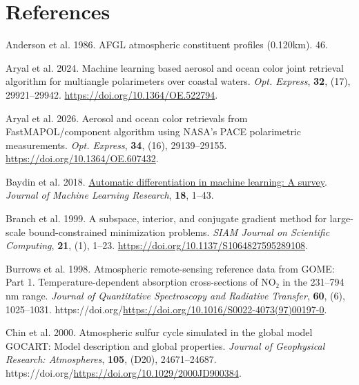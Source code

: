 \documentclass[
  11pt,
  letterpaper,
]{scrreprt}
\newlength{\cslhangindent}
\newenvironment{CSLReferences}[2] %
 {\begin{list}{}{%
  \setlength{\itemindent}{0pt}
  \setlength{\leftmargin}{0pt}
  \setlength{\parsep}{0pt}
  \ifodd #1
   \setlength{\leftmargin}{\cslhangindent}
   \setlength{\itemindent}{-1\cslhangindent}
  \fi
  \setlength{\itemsep}{#2\baselineskip}}}
 {\end{list}}
\begin{document}
\chapter*{References}\label{references}


\label{refs}
\begin{CSLReferences}{1}{1}
Anderson et al. 1986. AFGL atmospheric constituent profiles (0.120km).
46.

Aryal et al. 2024. Machine learning based aerosol and ocean color joint
retrieval algorithm for multiangle polarimeters over coastal waters.
\emph{Opt. Express}, \textbf{32}, (17), 29921--29942.
\url{https://doi.org/10.1364/OE.522794}.

Aryal et al. 2026. Aerosol and ocean color retrievals from
FastMAPOL/component algorithm using NASA's PACE polarimetric
measurements. \emph{Opt. Express}, \textbf{34}, (16), 29139--29155.
\url{https://doi.org/10.1364/OE.607432}.

Baydin et al. 2018. \href{https://arxiv.org/abs/1502.05767}{Automatic
differentiation in machine learning: A survey}. \emph{Journal of Machine
Learning Research}, \textbf{18}, 1--43.

Branch et al. 1999. A subspace, interior, and conjugate gradient method
for large-scale bound-constrained minimization problems. \emph{SIAM
Journal on Scientific Computing}, \textbf{21}, (1), 1--23.
\url{https://doi.org/10.1137/S1064827595289108}.

Burrows et al. 1998. Atmospheric remote-sensing reference data from
GOME: Part 1. Temperature-dependent absorption cross-sections of NO₂ in
the 231--794 nm range. \emph{Journal of Quantitative Spectroscopy and
Radiative Transfer}, \textbf{60}, (6), 1025--1031.
https://doi.org/\url{https://doi.org/10.1016/S0022-4073(97)00197-0}.

Chin et al. 2000. Atmospheric sulfur cycle simulated in the global model
GOCART: Model description and global properties. \emph{Journal of
Geophysical Research: Atmospheres}, \textbf{105}, (D20), 24671--24687.
https://doi.org/\url{https://doi.org/10.1029/2000JD900384}.


\end{CSLReferences}
\end{document}
